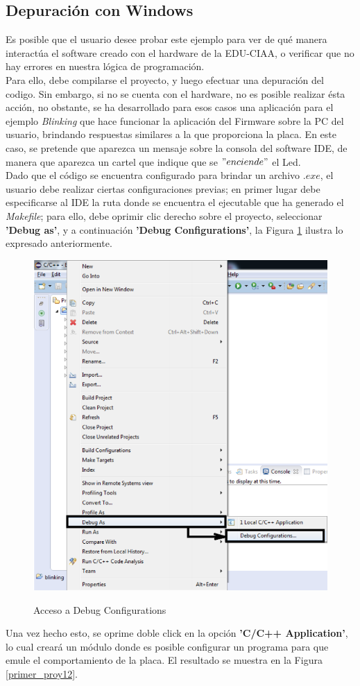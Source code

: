 \documentclass[12pt,letterpaper]{article}
\begin{document}
\subsection{Depuración con Windows}
Es posible que el usuario desee probar este ejemplo  para ver de qué manera interactúa el software creado con
el hardware de la EDU-CIAA, o verificar que no hay errores en nuestra lógica de programación.\\
Para ello, debe compilarse el proyecto, y luego efectuar una depuración del codigo. Sin embargo, si no se cuenta con el hardware, no es posible realizar ésta acción, no obstante, se ha desarrollado para esos casos una aplicación para el ejemplo \textit{Blinking} que hace funcionar la aplicación del Firmware sobre la PC del usuario, brindando respuestas similares a la que proporciona la placa. En este caso, se pretende que aparezca un mensaje sobre la consola del software IDE, de manera que aparezca un cartel que indique que se $"enciende"$ el Led.\\

Dado que el código se encuentra configurado para brindar un archivo \textit{$.exe$}, el usuario debe realizar ciertas configuraciones previas; en primer lugar debe especificarse al IDE la ruta donde se encuentra el ejecutable que ha generado el \textit{Makefile}; para ello, debe oprimir clic derecho sobre el proyecto, seleccionar \textbf{'Debug as'}, y a continuación \textbf{'Debug Configurations'}, la Figura \ref{primer_proy11} ilustra lo expresado anteriormente.

\begin{center}
\begin{figure}[!h]
\centering
\includegraphics[width=5 cm]{figuras/primer_proy11.png}\\
\caption{Acceso a Debug Configurations}
\label{primer_proy11}
\end{figure}
\end{center}

Una vez hecho esto, se oprime doble click en la opción \textbf{'C/C++ Application'}, lo cual  creará un módulo donde es posible configurar un programa para que emule el comportamiento de la placa.
El resultado se muestra en la Figura \ref{primer_proy12}.
\end{document}
